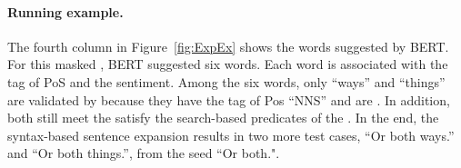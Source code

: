 \paragraph*{Running example.} The fourth column in Figure~\ref{fig:ExpEx} shows the words suggested by BERT. For this masked \sent, BERT suggested six words. Each word is associated with the tag of PoS and the sentiment. Among the six words, only ``ways'' and ``things'' are validated by \tool because they have the tag of Pos ``NNS'' and are \neu. In addition, both \sents still meet the satisfy the search-based predicates of the \lc \SareqExOne. In the end,  the syntax-based sentence expansion results in two more test cases,  ``Or both ways.'' and ``Or both things.'', from the seed ``Or both.".



